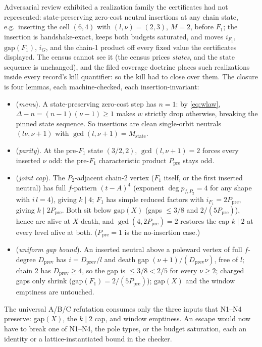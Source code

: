 \documentclass[11pt]{article}
\theoremstyle{definition}
\theoremstyle{remark}
\begin{document}
Adversarial review exhibited a realization family the certificates had not represented: state-preserving zero-cost neutral insertions at any chain state, e.g.\ inserting the cell $(6,4)$ with $(l,\nu)=(2,3)$, $M=2$, before $F_1$; the insertion is handshake-exact, keeps both budgets saturated, and moves $i_{F_1}$, $\mathrm{gap}(F_1)$, $i_G$, and the chain-1 product off every fixed value the certificates displayed. The census cannot see it (the census prices \emph{states}, and the state sequence is unchanged), and the filed coverage doctrine places such realizations inside every record's kill quantifier: so the kill had to close over them. The closure is four lemmas, each machine-checked, each insertion-invariant:
\begin{itemize}
\item[\textbf{N1}] (\emph{menu}). A state-preserving zero-cost step has $n=1$: by \eqref{eq:wlaw}, $\Delta-n=(n-1)(\nu-1)\geq1$ makes $w$ strictly drop otherwise, breaking the pinned state sequence. So insertions are clean single-orbit neutrals $(l\nu,\nu+1)$ with $\gcd(l,\nu+1)=M_{\mathrm{state}}$.
\item[\textbf{N2}] (\emph{parity}). At the pre-$F_1$ state $(3/2,2)$, $\gcd(l,\nu+1)=2$ forces every inserted $\nu$ odd: the pre-$F_1$ characteristic product $P_{\mathrm{pre}}$ stays odd.
\item[\textbf{N3}] (\emph{joint cap}). The $P_2$-adjacent chain-2 vertex ($F_1$ itself, or the first inserted neutral) has full $f$-pattern $(t-A)^4$ (exponent $\deg p_{f,P_2}=4$ for any shape with $i\,l=4$), giving $k\mid4$; $F_1$ has simple reduced factors with $i_{F_1}=2P_{\mathrm{pre}}$, giving $k\mid2P_{\mathrm{pre}}$. Both sit below $\mathrm{gap}(X)$ (gaps $\leq3/8$ and $2/(5P_{\mathrm{pre}})$), hence are alive at $X$-death, and $\gcd(4,2P_{\mathrm{pre}})=2$ restores the cap $k\mid2$ at every level alive at both. ($P_{\mathrm{pre}}=1$ is the no-insertion case.)
\item[\textbf{N4}] (\emph{uniform gap bound}). An inserted neutral above a poleward vertex of full $f$-degree $D_{\mathrm{prev}}$ has $i=D_{\mathrm{prev}}/l$ and death gap $(\nu+1)/(D_{\mathrm{prev}}\nu)$, free of $l$; chain 2 has $D_{\mathrm{prev}}\geq4$, so the gap is $\leq3/8<2/5$ for every $\nu\geq2$; charged gaps only shrink ($\mathrm{gap}(F_1)=2/(5P_{\mathrm{pre}})$); $\mathrm{gap}(X)$ and the window emptiness are untouched.
\end{itemize}
The universal A/B/C refutation consumes only the three inputs that N1--N4 preserve: $\mathrm{gap}(X)$, the $k\mid2$ cap, and window emptiness. An escape would now have to break one of N1--N4, the pole types, or the budget saturation, each an identity or a lattice-instantiated bound in the checker.
\end{document}
